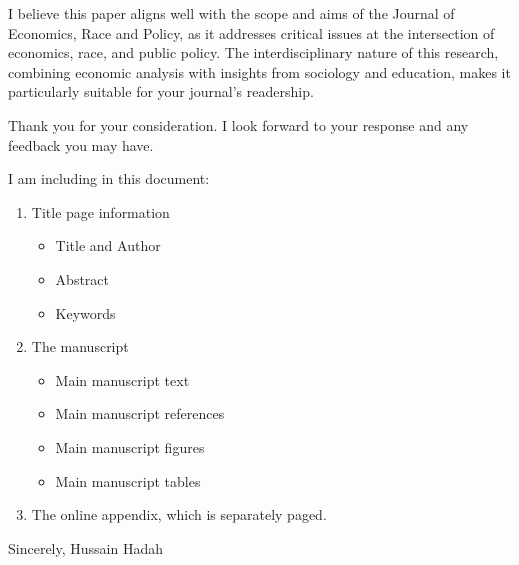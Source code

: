\documentclass[12pt,english]{article}
\begin{document}
\bigskip
\noindent I believe this paper aligns well with the scope and aims of the Journal of Economics, Race and Policy, as it addresses critical issues at the intersection of economics, race, and public policy. The interdisciplinary nature of this research, combining economic analysis with insights from sociology and education, makes it particularly suitable for your journal's readership.

\bigskip
\noindent Thank you for your consideration. I look forward to your response and any feedback you may have.

I am including in this document:
\begin{enumerate}
    \item Title page information
    \begin{itemize}
        \item Title and Author
        \item Abstract
        \item Keywords
    \end{itemize}
    \item The manuscript
    \begin{itemize}
        \item Main manuscript text
        \item Main manuscript references
        \item Main manuscript figures
        \item Main manuscript tables
    \end{itemize}    
    \item The online appendix, which is separately paged.
\end{enumerate}


\bigskip
\noindent Sincerely,
\noindent Hussain Hadah




\end{document}
